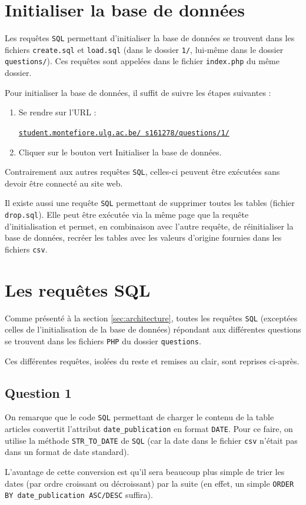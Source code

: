 \documentclass[a4paper, 12pt]{article}
\begin{document}
	\section{Initialiser la base de données}
	Les requêtes \texttt{SQL} permettant d'initialiser la base de données se trouvent dans les fichiers \texttt{create.sql} et \texttt{load.sql} (dans le dossier \texttt{1/}, lui-même dans le dossier \texttt{questions/}). Ces requêtes sont appelées dans le fichier \texttt{index.php} du même dossier.\par
	Pour initialiser la base de données, il suffit de suivre les étapes suivantes :
	\begin{framedmeth*}
    	\begin{enumerate}
    	    \item Se rendre sur l'URL :
    	    \begin{center}
    	        \href{http://www.student.montefiore.ulg.ac.be/\textasciitilde s161278/questions/1/}{\texttt{student.montefiore.ulg.ac.be/~s161278/questions/1/}}
    	    \end{center}
    	    \item Cliquer sur le bouton vert \og Initialiser la base de données\fg{}.
    	\end{enumerate}
    \end{framedmeth*}
    Contrairement aux autres requêtes \texttt{SQL}, celles-ci peuvent être exécutées sans devoir être connecté au site web.\par
    Il existe aussi une requête \texttt{SQL} permettant de supprimer toutes les tables (fichier \texttt{drop.sql}). Elle peut être exécutée via la même page que la requête d'initialisation et permet, en combinaison avec l'autre requête, de réinitialiser la base de données, \cad{} recréer les tables avec les valeurs d'origine fournies dans les fichiers \texttt{csv}.
	\section{Les requêtes SQL}
	Comme présenté à la section \ref{sec:architecture}, toutes les requêtes \texttt{SQL} (exceptées celles de l'initialisation de la base de données) répondant aux différentes questions se trouvent dans les fichiers \texttt{PHP} du dossier \texttt{questions}.\par
	Ces différentes requêtes, isolées du reste et remises au clair, sont reprises ci-après.
	\subsection{Question 1}
	On remarque que le code \texttt{SQL} permettant de charger le contenu de la table articles convertit l'attribut \texttt{date\_publication} en format \texttt{DATE}. Pour ce faire, on utilise la méthode \texttt{STR\_TO\_DATE} de \texttt{SQL} (car la date dans le fichier \texttt{csv} n'était pas dans un format de date standard).\par
	L'avantage de cette conversion est qu'il sera beaucoup plus simple de trier les dates (par ordre croissant ou décroissant) par la suite (en effet, un simple \texttt{ORDER BY date\_publication ASC/DESC} suffira).
	
\end{document}
